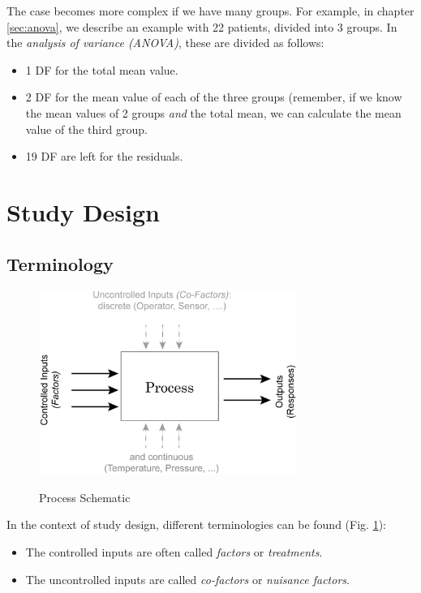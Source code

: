 The case becomes more complex if we have many groups. For example, in chapter \ref{sec:anova}, we describe an example with 22 patients, divided into 3 groups. In the \emph{analysis of variance (ANOVA)}, these are divided as follows:

\begin{itemize}
  \item 1 DF for the total mean value.
  \item 2 DF for the mean value of each of the three groups (remember, if we know the mean values of 2 groups \emph{and} the total mean, we can calculate the mean value of the third group.
  \item 19 DF are left for the residuals.
\end{itemize}

\section{Study Design}

\subsection{Terminology}

\begin{figure}
  \centering
  \includegraphics[width=0.75\textwidth]{../Images/Process_Optimization.jpg}\\
  \caption{Process Schematic}\label{fig:StudyDesign}
\end{figure}

In the context of study design, different terminologies can be found (Fig. \ref{fig:StudyDesign}):

\begin{itemize}
    \item{The controlled inputs are often called \emph{factors} or
            \emph{treatments}.}
    \item{The uncontrolled inputs are called \emph{co-factors} or
            \emph{nuisance factors}.}
\end{itemize}

